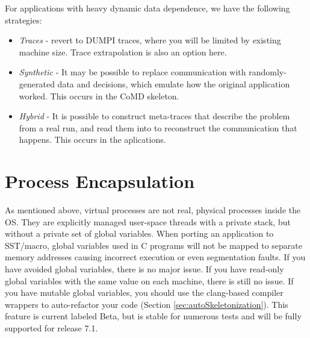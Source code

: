 For applications with heavy dynamic data dependence, we have the following strategies:
\begin{itemize}
\item \textit{Traces}  - revert to DUMPI traces, where you will be limited by existing machine size.  Trace extrapolation is also an option here.
\item \textit{Synthetic} - It may be possible to replace communication with randomly-generated data and decisions, which emulate how the original application worked. This occurs in the CoMD skeleton.
\item \textit{Hybrid} - It is possible to construct meta-traces that describe the problem from a real run, and read them into \sstmacro to reconstruct the communication that happens.  This occurs in the  aplications.
\end{itemize}

\section{Process Encapsulation}
\label{sec:processEncapsulation}
As mentioned above, virtual processes are not real, physical processes inside the OS.
They are explicitly managed user-space threads with a private stack, but without a private set of global variables.
When porting an application to SST/macro, global variables used in C programs will not be mapped to separate memory addresses causing incorrect execution or even segmentation faults.
If you have avoided global variables, there is no major issue.  
If you have read-only global variables with the same value on each machine, there is still no issue.
If you have mutable global variables, you should use the  clang-based compiler wrappers to auto-refactor your code (Section \ref{sec:autoSkeletonization}).
This feature is current labeled Beta, but is stable for numerous tests and will be fully supported for release 7.1.

